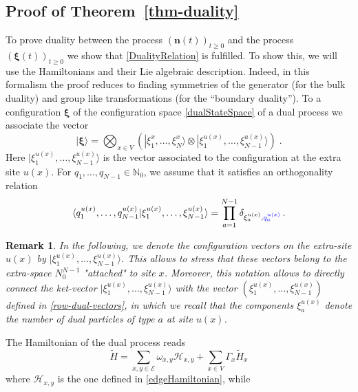 \documentclass[10pt]{article}
\numberwithin{equation}{section}
\numberwithin{equation}{subsection}
\newtheorem{remark}{Remark}
\newcommand{\dt}{\;.}
\newcommand{\fra}[1]{\textcolor[rgb]{0,0,1}{#1}}
\begin{document}
\subsection{Proof of Theorem~\ref{thm-duality}}
\label{proof-th-duality}
To prove duality between the process $(\bm{n}(t))_{t\geq 0}$ and the process  $(\bm{\xi}(t))_{t\geq 0}$ we  show that \eqref{DualityRelation} is fulfilled.  To show this, we will use the Hamiltonians and their Lie algebraic description. Indeed, in this formalism the proof
reduces to finding symmetries of the generator (for the bulk duality) and group like transformations (for the ``boundary duality'').
To a configuration $\bm{\xi}$ of the configuration space  \eqref{dualStateSpace} of a dual process we associate the vector
\begin{equation}
    |\bm{\xi}\rangle=\bigotimes_{x\in V}\left(|\xi_{1}^{x},\ldots,\xi_{N}^{x}\rangle\otimes |\xi_{1}^{u(x)},\ldots,\xi_{N-1}^{u(x)}\rangle\right)\dt
\end{equation}
{Here $|\xi_{1}^{u(x)},\ldots,\xi_{N-1}^{u(x)}\rangle$ is the vector associated to the configuration at the extra site $u(x)$.  For $q_{1},\ldots,q_{N-1}\in \mathbb{N}_{0}$, we assume that it satisfies an orthogonality relation
\begin{equation}\label{ortho-extraSite}
	\langle q_{1}^{u(x)},\ldots,q^{u(x)}_{N-1}|\xi_{1}^{u(x)},\ldots,\xi_{N-1}^{u(x)}\rangle=\prod_{a=1}^{N-1}\delta_{\xi_{a}^{u(x)},\fra{q_{a}^{u(x)}}}\,.
\end{equation} }
{\begin{remark}\label{reamrk-extraSite}
	In the following, we denote the configuration vectors on the extra-site $u(x)$ by $|\xi_{1}^{u(x)},\ldots,\xi_{N-1}^{u(x)}\rangle$. This allows to stress that these vectors belong to the extra-space $N_{0}^{N-1}$ "attached" to site $x$. Moreover, this notation allows to directly connect the ket-vector $|\xi_{1}^{u(x)},\ldots,\xi_{N-1}^{u(x)}\rangle$ with the vector $(\xi_{1}^{u(x)},\ldots,\xi_{N-1}^{u(x)})$ defined in \eqref{row-dual-vectors}, in which we recall that the components $\xi_{a}^{u(x)}$ denote the number of dual particles of type $a$ at site $u(x)$.
\end{remark}} 
The Hamiltonian of the dual process reads
\begin{equation}\label{DualHamiltonian}
    \widetilde{H}=\sum_{x,y\in \mathcal{E}}\omega_{x,y}\mathcal{H}_{x,y}+\sum_{x\in V}\Gamma_{x}\widetilde{H}_{x}
\end{equation}
where $\mathcal{H}_{x,y}$ is the one defined in \eqref{edgeHamiltonian}, while 
\end{document}
